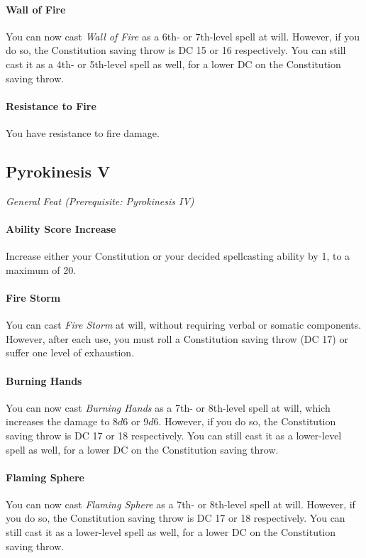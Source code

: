 \documentclass[twocolumn]{dndbook}
\begin{document}
\paragraph*{Wall of Fire} You can now cast \emph{Wall of Fire} as a 6th- or 7th-level spell at will.
However, if you do so, the Constitution saving throw is DC 15 or 16 respectively.
You can still cast it as a 4th- or 5th-level spell as well, for a lower DC on the Constitution saving throw.
\paragraph*{Resistance to Fire} You have resistance to fire damage.

\subsection{Pyrokinesis V}
{\emph{General Feat (Prerequisite: Pyrokinesis IV)}}\par
\paragraph*{Ability Score Increase} Increase either your Constitution or your decided spellcasting ability by 1, to a maximum of 20.
\paragraph*{Fire Storm} You can cast \emph{Fire Storm} at will,
without requiring verbal or somatic components. However, after each use, you must roll a Constitution saving throw (DC 17) or suffer one level of exhaustion.
\paragraph*{Burning Hands} You can now cast \emph{Burning Hands} as a 7th- or 8th-level spell at will,
which increases the damage to $ 8d6 $ or $ 9d6 $. However, if you do so, the Constitution saving throw is DC 17 or 18 respectively.
You can still cast it as a lower-level spell as well, for a lower DC on the Constitution saving throw.
\paragraph*{Flaming Sphere} You can now cast \emph{Flaming Sphere} as a 7th- or 8th-level spell at will.
However, if you do so, the Constitution saving throw is DC 17 or 18 respectively.
You can still cast it as a lower-level spell as well, for a lower DC on the Constitution saving throw.
\end{document}
